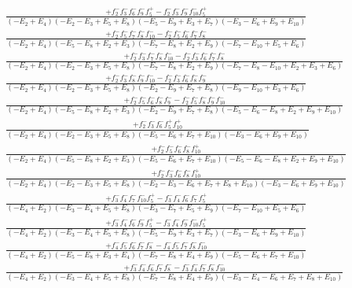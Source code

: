 \documentclass{article}
\begin{document}
\[\begin{array}{rcl}
\frac{+f_{2}^{-}f_{3}^{-}f_{6}^{-}f_{9}^{-}f_{5}^{+}-f_{2}^{-}f_{3}^{-}f_{9}^{-}f_{10}^{-}f_{5}^{+}}{(-E_{2}+E_{4})(-E_{2}-E_{3}+E_{5}+E_{8})(-E_{5}-E_{9}+E_{3}+E_{7})(-E_{3}-E_{6}+E_{9}+E_{10})}\\
\frac{+f_{2}^{-}f_{5}^{-}f_{7}^{-}f_{8}^{-}f_{10}^{-}-f_{2}^{-}f_{5}^{-}f_{6}^{-}f_{7}^{-}f_{8}^{-}}{(-E_{2}+E_{4})(-E_{5}-E_{8}+E_{2}+E_{3})(-E_{7}-E_{8}+E_{2}+E_{9})(-E_{7}-E_{10}+E_{5}+E_{6})}\\
\frac{+f_{2}^{-}f_{3}^{-}f_{7}^{-}f_{8}^{-}f_{10}^{-}-f_{2}^{-}f_{3}^{-}f_{6}^{-}f_{7}^{-}f_{8}^{-}}{(-E_{2}+E_{4})(-E_{2}-E_{3}+E_{5}+E_{8})(-E_{7}-E_{8}+E_{2}+E_{9})(-E_{7}-E_{8}-E_{10}+E_{2}+E_{3}+E_{6})}\\
\frac{+f_{2}^{-}f_{3}^{-}f_{8}^{-}f_{9}^{-}f_{10}^{-}-f_{2}^{-}f_{3}^{-}f_{6}^{-}f_{8}^{-}f_{9}^{-}}{(-E_{2}+E_{4})(-E_{2}-E_{3}+E_{5}+E_{8})(-E_{2}-E_{9}+E_{7}+E_{8})(-E_{9}-E_{10}+E_{3}+E_{6})}\\
\frac{+f_{2}^{-}f_{5}^{-}f_{6}^{-}f_{8}^{-}f_{9}^{-}-f_{2}^{-}f_{5}^{-}f_{8}^{-}f_{9}^{-}f_{10}^{-}}{(-E_{2}+E_{4})(-E_{5}-E_{8}+E_{2}+E_{3})(-E_{2}-E_{9}+E_{7}+E_{8})(-E_{5}-E_{6}-E_{8}+E_{2}+E_{9}+E_{10})}\\
\frac{+f_{2}^{-}f_{3}^{-}f_{6}^{-}f_{5}^{+}f_{10}^{+}}{(-E_{2}+E_{4})(-E_{2}-E_{3}+E_{5}+E_{8})(-E_{5}-E_{6}+E_{7}+E_{10})(-E_{3}-E_{6}+E_{9}+E_{10})}\\
\frac{+f_{2}^{-}f_{5}^{-}f_{6}^{-}f_{8}^{-}f_{10}^{+}}{(-E_{2}+E_{4})(-E_{5}-E_{8}+E_{2}+E_{3})(-E_{5}-E_{6}+E_{7}+E_{10})(-E_{5}-E_{6}-E_{8}+E_{2}+E_{9}+E_{10})}\\
\frac{+f_{2}^{-}f_{3}^{-}f_{6}^{-}f_{8}^{-}f_{10}^{+}}{(-E_{2}+E_{4})(-E_{2}-E_{3}+E_{5}+E_{8})(-E_{2}-E_{3}-E_{6}+E_{7}+E_{8}+E_{10})(-E_{3}-E_{6}+E_{9}+E_{10})}\\
\frac{+f_{3}^{-}f_{4}^{-}f_{7}^{-}f_{10}^{-}f_{5}^{+}-f_{3}^{-}f_{4}^{-}f_{6}^{-}f_{7}^{-}f_{5}^{+}}{(-E_{4}+E_{2})(-E_{3}-E_{4}+E_{5}+E_{8})(-E_{3}-E_{7}+E_{5}+E_{9})(-E_{7}-E_{10}+E_{5}+E_{6})}\\
\frac{+f_{3}^{-}f_{4}^{-}f_{6}^{-}f_{9}^{-}f_{5}^{+}-f_{3}^{-}f_{4}^{-}f_{9}^{-}f_{10}^{-}f_{5}^{+}}{(-E_{4}+E_{2})(-E_{3}-E_{4}+E_{5}+E_{8})(-E_{5}-E_{9}+E_{3}+E_{7})(-E_{3}-E_{6}+E_{9}+E_{10})}\\
\frac{+f_{4}^{-}f_{5}^{-}f_{6}^{-}f_{7}^{-}f_{8}^{-}-f_{4}^{-}f_{5}^{-}f_{7}^{-}f_{8}^{-}f_{10}^{-}}{(-E_{4}+E_{2})(-E_{5}-E_{8}+E_{3}+E_{4})(-E_{7}-E_{8}+E_{4}+E_{9})(-E_{5}-E_{6}+E_{7}+E_{10})}\\
\frac{+f_{3}^{-}f_{4}^{-}f_{6}^{-}f_{7}^{-}f_{8}^{-}-f_{3}^{-}f_{4}^{-}f_{7}^{-}f_{8}^{-}f_{10}^{-}}{(-E_{4}+E_{2})(-E_{3}-E_{4}+E_{5}+E_{8})(-E_{7}-E_{8}+E_{4}+E_{9})(-E_{3}-E_{4}-E_{6}+E_{7}+E_{8}+E_{10})}\\

\end{array}\]
\end{document}
